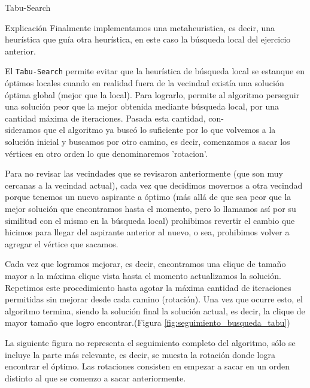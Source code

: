 \begin{section}{Tabu-Search}
	\begin{subsection}{Explicación}
		Finalmente implementamos una metaheuristica, es decir, una heurística que guía otra heurística, en este caso la búsqueda local del ejercicio anterior.

		El \texttt{Tabu-Search} permite evitar que la heurística de búsqueda local se estanque en óptimos locales cuando en realidad fuera de la vecindad existía una solución óptima global (mejor que la local).
		Para lograrlo, permite al algoritmo perseguir una solución peor que la mejor obtenida mediante búsqueda local, por una cantidad máxima de iteraciones.
		Pasada esta cantidad, con-\\sideramos que el algoritmo ya buscó lo suficiente por lo que volvemos a la solución inicial y buscamos por otro camino, es decir, comenzamos a sacar los vértices en otro orden lo que denominaremos 'rotacion'.

		Para no revisar las vecindades que se revisaron anteriormente (que son muy cercanas a la vecindad actual),
		cada vez que decidimos movernos a otra vecindad porque tenemos un nuevo aspirante a óptimo (más allá de que sea peor que la mejor solución que encontramos hasta el momento, pero lo llamamos así por su similitud con el mismo en la búsqueda local)
		prohibimos revertir el cambio que hicimos para llegar del aspirante anterior al nuevo, o sea, prohibimos volver a agregar el vértice que sacamos.
		
		Cada vez que logramos mejorar, es decir, encontramos una clique de tamaño mayor a la máxima clique vista hasta el momento actualizamos la solución.
		Repetimos este procedimiento hasta agotar la máxima cantidad de iteraciones permitidas sin mejorar desde cada camino (rotación). Una vez que ocurre esto, el algoritmo termina, siendo la solución final la solución actual, es decir, la clique de mayor tamaño que logro encontrar.(Figura \ref{fig:seguimiento_busqueda_tabu})\Pa


		La siguiente figura no representa el seguimiento completo del algoritmo, sólo se incluye la parte más relevante, es decir, se muesta la rotación donde logra encontrar el óptimo.  Las rotaciones consisten en empezar a sacar en un orden distinto al que se comenzo a sacar anteriormente.


\end{subsection}
\end{section}
